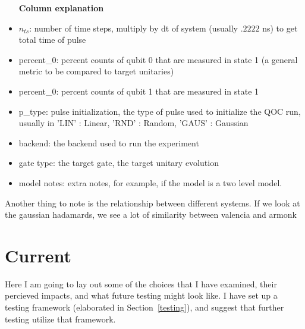 \documentclass[12pt]{article}
\begin{document}
\begin{itemize}
    \item [\textbf{Column explanation}]
    \item $n_{ts}$: number of time steps, multiply by dt of system (usually $.2222$ ns) to get total time of pulse
    \item percent\_0: percent counts of qubit 0 that are measured in state 1 (a general metric to
    be compared to target unitaries)
    \item percent\_0: percent counts of qubit 1 that are measured in state 1 
    \item p\_type: pulse initialization, the type of pulse used to initialize
    the QOC run, usually in {'LIN' : Linear, 'RND' : Random, 'GAUS' : Gaussian}
    \item backend: the backend used to run the experiment
    \item gate type: the target gate, the target unitary evolution
    \item model notes: extra notes, for example, if the model is a two level model.
\end{itemize}


Another thing to note is the relationship between different systems. If we look at the gaussian hadamards, we see a lot of similarity between valencia and armonk

\section{Current}\label{current}

Here I am going to lay out some of the choices that I have examined, their
percieved impacts, and what future testing might look like. I have set up a
testing framework (elaborated in Section~\ref{testing}), and suggest that
further testing utilize that framework.
\end{document}

